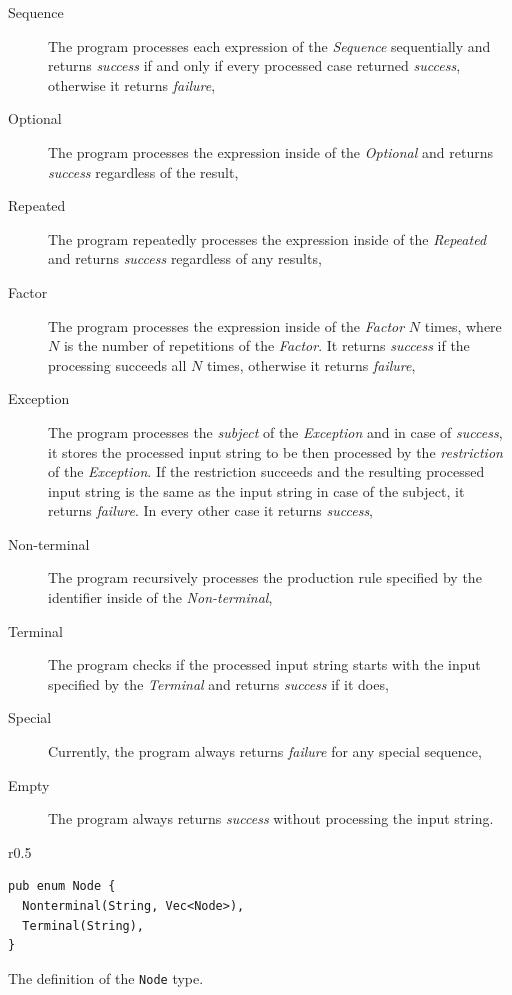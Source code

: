 \documentclass[english,engineering]{wizthesis}
\begin{document}
\begin{description}
  \item[Sequence] The program processes each expression of the \emph{Sequence}
  sequentially and returns \emph{success} if and only if every processed case
  returned \emph{success}, otherwise it returns \emph{failure},
  \item[Optional] The program processes the expression inside of the
  \emph{Optional} and returns \emph{success} regardless of the result,
  \item[Repeated] The program repeatedly processes the expression inside of the
  \emph{Repeated} and returns \emph{success} regardless of any results,
  \item[Factor] The program processes the expression inside of the \emph{Factor}
  $N$ times, where $N$ is the number of repetitions of the \emph{Factor}. It
  returns \emph{success} if the processing succeeds all $N$ times, otherwise it
  returns \emph{failure},
  \item[Exception] The program processes the \emph{subject} of the
  \emph{Exception} and in case of \emph{success}, it stores the processed input
  string to be then processed by the \emph{restriction} of the \emph{Exception}.
  If the restriction succeeds and the resulting processed input string is the
  same as the input string in case of the subject, it returns \emph{failure}.
  In every other case it returns \emph{success},
  \item[Non-terminal] The program recursively processes the production rule
  specified by the identifier inside of the \emph{Non-terminal},
  \item[Terminal] The program checks if the processed input string starts with
  the input specified by the \emph{Terminal} and returns \emph{success} if it
  does,
  \item[Special] Currently, the program always returns \emph{failure} for any
  special sequence,
  \item[Empty] The program always returns \emph{success} without processing the
  input string.
\end{description}

\begin{wraplisting}{r}{0.5\textwidth}
  \begin{verbatim}
pub enum Node {
  Nonterminal(String, Vec<Node>),
  Terminal(String),
}
  \end{verbatim}
  \caption{The definition of the \texttt{Node} type.}
  \label{lst:checker-node}
\end{wraplisting}
\end{document}

